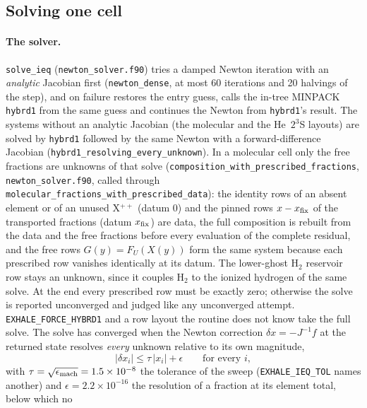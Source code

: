 \subsection{Solving one cell}
\label{sec:ionization:solve}

\paragraph{The solver.} \texttt{solve\_ieq} (\texttt{newton\_solver.f90})
tries a damped Newton iteration with an \emph{analytic} Jacobian first
(\texttt{newton\_dense}, at most 60 iterations and 20 halvings of the step),
and on failure restores the entry guess, calls the in-tree MINPACK
\texttt{hybrd1} from the same guess and continues the Newton from
\texttt{hybrd1}'s result. The systems without an analytic Jacobian (the
molecular and the He~$2^3$S layouts) are solved by \texttt{hybrd1} followed
by the same Newton with a forward-difference Jacobian
(\texttt{hybrd1\_resolving\_every\_unknown}).  In a molecular cell only the
free fractions are unknowns of that solve
(\texttt{composition\_with\_prescribed\_fractions}, \texttt{newton\_solver.f90},
called through \texttt{molecular\_fractions\_with\_prescribed\_data}): the
identity rows of an absent element or of an unused X$^{++}$ (datum 0) and the
pinned rows $x - x_{\rm fix}$ of the transported fractions (datum $x_{\rm
fix}$) are data, the full composition is rebuilt from the data and the free
fractions before every evaluation of the complete residual, and the free
rows $G(y) = F_U(X(y))$ form the same system because each prescribed row
vanishes identically at its datum.  The lower-ghost H$_2$ reservoir row
stays an unknown, since it couples H$_2$ to the ionized hydrogen of the same
solve.  At the end every prescribed row must be exactly zero; otherwise the
solve is reported unconverged and judged like any unconverged attempt.
\texttt{EXHALE\_FORCE\_HYBRD1} and a row layout the routine does not know
take the full solve. The solve has converged when
the Newton correction $\delta x=-J^{-1}f$ at the returned state resolves
\emph{every} unknown relative to its own magnitude,
%
\begin{equation}
  |\delta x_i| \le \tau\,|x_i| + \epsilon \qquad\text{for every } i,
  \label{eq:ion:stop}
\end{equation}
%
with $\tau=\sqrt{\epsilon_{\rm mach}}=1.5\times10^{-8}$ the tolerance of the
sweep (\texttt{EXHALE\_IEQ\_TOL} names another) and $\epsilon=2.2\times
10^{-16}$ the resolution of a fraction at its element total, below which no
